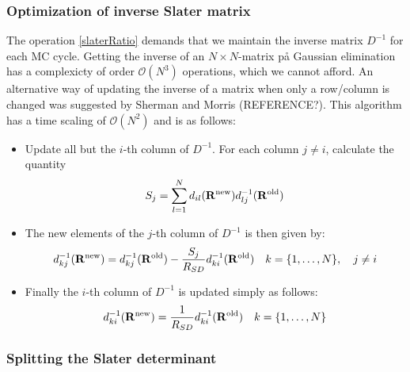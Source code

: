 \documentclass[english, a4paper]{article}
\begin{document}
\subsubsection{Optimization of inverse Slater matrix}
\noindent The operation \eqref{slaterRatio} demands that we maintain the inverse matrix $D^{-1}$ for each
MC cycle. Getting the inverse of an $N\times N$-matrix på Gaussian elimination has a complexicty of order
$\mathcal{O}(N^3)$ operations, which we cannot afford. An alternative way of updating the inverse
of a matrix when only a row/column is changed was suggested by Sherman and Morris (REFERENCE?). 
This algorithm has a time scaling
of $\mathcal{O}(N^2)$ and is as follows:
\begin{itemize}
 \item Update all but the $i$-th column of $D^{-1}$. For each column $j\neq i$,
 calculate the quantity 
 $$S_j = \sum_{l=1}^N d_{il} ({\bf R}^{\textrm{new}}) d_{lj}^{-1} ({\bf R}^{\textrm{old}})$$
 \item The new elements of the $j$-th column of $D^{-1}$ is then given by: 
 $$d_{kj}^{-1}({\bf R}^{\textrm{new}}) = d_{kj}^{-1}({\bf R}^{\textrm{old}}) - \frac{S_j}{R_{SD}}
 d_{ki}^{-1}({\bf R}^{\textrm{old}}) \quad k = \{1,\dots,N\}, \quad j \neq i$$
 \item Finally the $i$-th column of $D^{-1}$ is updated simply as follows:
 $$d_{ki}^{-1}({\bf R}^{\textrm{new}}) = \frac{1}{R_{SD}} d_{ki}^{-1}({\bf R}^{\textrm{old}}) \quad
 k = \{1,\dots,N\}$$
\end{itemize}

\subsubsection{Splitting the Slater determinant}
\end{document}
